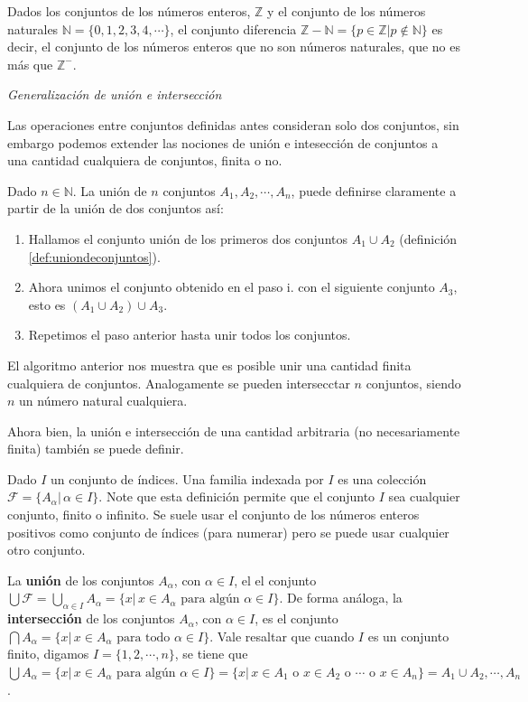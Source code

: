 \documentclass[12pt,]{krantz}
\theoremstyle{definition}
\theoremstyle{definition}
\theoremstyle{definition}
\theoremstyle{remark}
\let\BeginKnitrBlock\begin \let\EndKnitrBlock\end
\begin{document}
\BeginKnitrBlock{example}
\protect\hypertarget{exm:unnamed-chunk-15}{}{\label{exm:unnamed-chunk-15}
}Dados los conjuntos de los números enteros, \(\mathbb{Z}\) y el
conjunto de los números naturales \(\mathbb{N}=\{0,1,2,3,4,\cdots \}\),
el conjunto diferencia
\(\mathbb{Z}-\mathbb{N}=\{p\in\mathbb{Z}| p\notin \mathbb{N} \}\) es
decir, el conjunto de los números enteros que no son números naturales,
que no es más que \(\mathbb{Z}^{-}\).
\EndKnitrBlock{example}

\medskip

\emph{Generalización de unión e intersección}

\smallskip

Las operaciones entre conjuntos definidas antes consideran solo dos
conjuntos, sin embargo podemos extender las nociones de unión e
intesección de conjuntos a una cantidad cualquiera de conjuntos, finita
o no.

Dado \(n\in\mathbb{N}\). La unión de \(n\) conjuntos
\(A_{1}, A_{2},\cdots,A_{n}\), puede definirse claramente a partir de la
unión de dos conjuntos así:

\begin{enumerate}
\def\labelenumi{\roman{enumi})}
\item
  Hallamos el conjunto unión de los primeros dos conjuntos
  \(A_{1}\cup A_{2}\) (definición \ref{def:uniondeconjuntos}).
\item
  Ahora unimos el conjunto obtenido en el paso i. con el siguiente
  conjunto \(A_{3}\), esto es \((A_{1}\cup A_{2})\cup A_{3}\).
\item
  Repetimos el paso anterior hasta unir todos los conjuntos.
\end{enumerate}

El algoritmo anterior nos muestra que es posible unir una cantidad
finita cualquiera de conjuntos. Analogamente se pueden intersecctar
\(n\) conjuntos, siendo \(n\) un número natural cualquiera.

Ahora bien, la unión e intersección de una cantidad arbitraria (no
necesariamente finita) también se puede definir.

Dado \(I\) un conjunto de índices. Una familia indexada por \(I\) es una
colección \(\mathcal{F}=\{A_{\alpha} | \, \alpha\in I \}\). Note que
esta definición permite que el conjunto \(I\) sea cualquier conjunto,
finito o infinito. Se suele usar el conjunto de los números enteros
positivos como conjunto de índices (para numerar) pero se puede usar
cualquier otro conjunto.

La \textbf{unión} de los conjuntos \(A_{\alpha}\), con \(\alpha\in I\),
el el conjunto
\(\bigcup\mathcal{F}=\bigcup_{\alpha\in I} A_{\alpha}=\{x|\, x\in A_{\alpha} \mbox{ para algún } \alpha\in I \}\).
De forma análoga, la \textbf{intersección} de los conjuntos
\(A_{\alpha}\), con \(\alpha\in I\), es el conjunto
\(\bigcap A_{\alpha}=\{x|\, x\in A_{\alpha} \mbox{ para todo } \alpha\in I \}\).
Vale resaltar que cuando \(I\) es un conjunto finito, digamos
\(I=\{1,2,\cdots, n\}\), se tiene que
\(\bigcup A_{\alpha}=\{x|\, x\in A_{\alpha} \mbox{ para algún } \alpha\in I \}=\{x|\, x\in A_{1} \mbox{ o } x\in A_{2}\mbox{ o }\cdots \mbox{ o } x\in A_{n} \}=A_{1}\cup A_{2},\cdots , A_{n}\).
\end{document}
